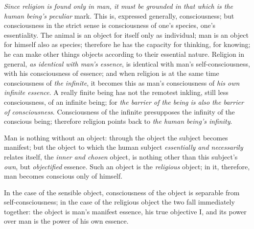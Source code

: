 \documentclass[12pt,a4paper]{book}
\begin{document}
\emph{Since religion is found only in man, it must be grounded in that which
is the human being's peculiar} mark. This is, expressed generally,
consciousness; but consciousness in the strict sense is consciousness of one's
species, one's essentiality. The animal is an object for itself only as
individual; man is an object for himself also as species; therefore he has the
capacity for thinking, for knowing; he can make other things objects according
to their essential nature. Religion in general, \emph{as identical with man's
essence}, is identical with man's self-consciousness, with his consciousness
of essence; and when religion is at the same time consciousness of \emph{the
infinite}, it becomes this as man's consciousness of \emph{his own infinite
essence}. A really finite being has not the remotest inkling, still less
consciousness, of an infinite being; for \emph{the barrier of the being is
also the barrier of consciousness}. Consciousness of the infinite presupposes
the infinity of the conscious being; therefore religion points back to
\emph{the human being's infinity}.

Man is nothing without an object: through the object the subject becomes
manifest; but the object to which the human subject \emph{essentially and
necessarily} relates itself, the \emph{inner and chosen} object, is nothing
other than this subject's \emph{own}, but \emph{objectified}
essence. Such an object is the \emph{religious} object; in it, therefore, man
becomes conscious only of himself.

In the case of the sensible object, consciousness of the object is separable
from self-consciousness; in the case of the religious object the two fall
immediately together: the object is man's manifest essence, his true objective
I, and its power over man is the power of his own essence.
\end{document}
